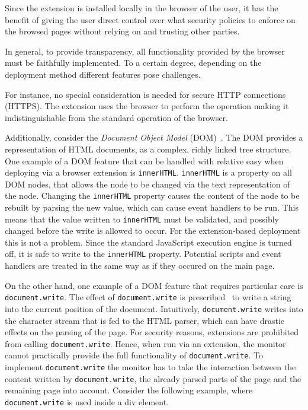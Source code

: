 \documentclass{llncs}
\begin{document}
Since the extension is installed locally in the browser of the user, it has
the benefit of giving the user direct control over what security policies to 
enforce on the browsed pages without relying on and trusting other parties.

In general, to provide transparency, all functionality provided by the browser
must be faithfully implemented. To a certain degree, depending on the deployment method 
different features pose challenges.

For instance, no special consideration is needed for secure HTTP connections
(HTTPS). The extension uses the browser to perform the operation making
it indistinguishable from the standard operation of the browser.

Additionally, consider the \emph{Document Object Model} (DOM)~\cite{DOM2}.  The
DOM provides a representation of HTML documents, as a complex, richly linked
tree structure.
One example of a DOM feature that can be handled with relative easy when deploying
via a browser extension is \lstinline{innerHTML}.  \lstinline{innerHTML} is a
property on all DOM nodes, that allows the node to be changed via the text
representation of the node.  Changing the \lstinline{innerHTML} property causes
the content of the node to be rebuilt by parsing the new value, which 
can cause event handlers to be run.
This means that the value written to \lstinline{innerHTML}
must be validated, and possibly changed before the write is allowed to occur.
%
For the extension-based deployment this is not a problem.  Since the standard
JavaScript execution engine is turned off, it is safe to write to the
\lstinline{innerHTML} property. Potential scripts and event handlers are
treated in the same way as if they occured on the main page.

On the other hand, one example of a DOM feature that requires particular care
is \lstinline{document.write}. 
%
The effect of \lstinline{document.write} is prescribed~\cite{DOM:LVL2} to write
a string into the current position of the document.  Intuitively,
\lstinline{document.write} writes into the character stream that is fed to the
HTML parser, which can have drastic effects on the parsing of the page. For
security reasons, extensions are prohibited from calling
\lstinline{document.write}. Hence, when run via an extension, the monitor
cannot practically provide the full functionality of
\lstinline{document.write}. To implement \lstinline{document.write} the monitor
has to take the interaction between the content written by
\lstinline{document.write}, the already parsed parts of the page and the
remaining page into account.  Consider the following example, where
\lstinline{document.write} is used inside a div element.
\end{document}
